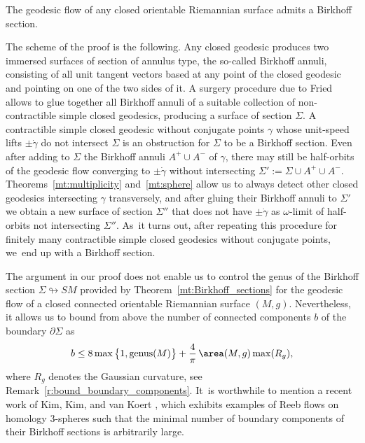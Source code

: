 \begin{MainThm}\label{mt:Birkhoff_sections}
The geodesic flow of any closed orientable Riemannian surface admits a Birkhoff section.
\end{MainThm}

The scheme of the proof is the following. Any closed geodesic produces two immersed surfaces of section of annulus type, the so-called Birkhoff annuli, consisting of all unit tangent vectors based at any point of the closed geodesic and pointing on one of the two sides of it. A surgery procedure due to Fried \cite{Fried:1983aa} allows to glue together all Birkhoff annuli of a suitable collection of non-contractible simple closed geodesics, producing a surface of section $\Sigma$. A contractible simple closed geodesic without conjugate points $\gamma$ whose unit-speed lifts $\pm\dot\gamma$ do not intersect $\Sigma$ is an obstruction for $\Sigma$ to be a Birkhoff section. Even after adding to $\Sigma$ the Birkhoff annuli $A^+\cup A^-$ of $\gamma$, there may still be half-orbits of the geodesic flow converging to $\pm\dot\gamma$ without intersecting $\Sigma':=\Sigma\cup A^+\cup A^-$. Theorems~\ref{mt:multiplicity} and~\ref{mt:sphere} allow us to always detect other closed geodesics intersecting $\gamma$ transversely, and after gluing their Birkhoff annuli to $\Sigma'$ we obtain a new surface of section $\Sigma''$ that does not have $\pm\dot\gamma$ as $\omega$-limit of half-orbits not intersecting $\Sigma''$. As~it turns out, after repeating this procedure for finitely many contractible simple closed geodesics without conjugate points, we~end up with a Birkhoff section.

\begin{Remark}
The argument in our proof does not enable us to control the genus of the Birkhoff section $\Sigma\looparrowright SM$ provided by Theorem~\ref{mt:Birkhoff_sections} for the geodesic flow of a closed connected orientable Riemannian surface $(M,g)$. Nevertheless, it allows us to bound from above the number of connected components $b$ of the boundary $\partial\Sigma$ as
\[
 b\leq 8\max\big\{1,\mathrm{genus}(M)\big\}+\frac{4}{\pi}\,\area(M,g)\max(R_g),
\]
where $R_g$ denotes the Gaussian curvature, see Remark~\ref{r:bound_boundary_components}. It~is worthwhile to mention a recent work of Kim, Kim, and van Koert \cite{Kim:2022aa}, which exhibits examples of Reeb flows on homology 3-spheres such that the minimal number of boundary components of their Birkhoff sections is arbitrarily large.
\end{Remark}

